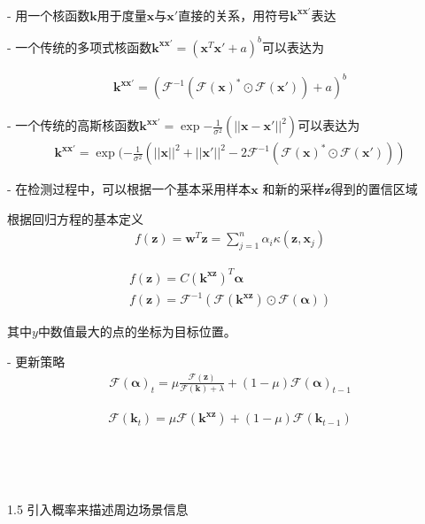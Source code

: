 ​

- 用一个核函数$\mathbf{k}$用于度量$\mathbf{x}$与$\mathbf{x'}$直接的关系，用符号$\mathbf{k}^{\mathbf{x}\mathbf{x'}}$表达

- 一个传统的多项式核函数$\mathbf{k}^{\mathbf{x}\mathbf{x'}}=(\mathbf{x}^T\mathbf{x'}+a)^b$可以表达为

\begin{align}
\mathbf{k}^{\mathbf{x}\mathbf{x'}}=(\mathcal{F}^{-1}(\mathcal{F}(\mathbf{x})^*\odot\mathcal{F}(\mathbf{x'}))+a)^b
\end{align}

- 一个传统的高斯核函数$\mathbf{k}^{\mathbf{x}\mathbf{x'}}=\exp{-\frac{1}{\sigma^2}(||\mathbf{x}-\mathbf{x'}||^2)}$可以表达为
\begin{align}
\mathbf{k}^{\mathbf{x}\mathbf{x'}}=\exp(-\frac{1}{\sigma^2}(||\mathbf{x}||^2+||\mathbf{x'}||^2-2\mathcal{F}^{-1}(\mathcal{F}(\mathbf{x})^*\odot\mathcal{F}(\mathbf{x'})))
\end{align}

- 在检测过程中，可以根据一个基本采用样本$\mathbf{x}$ 和新的采样$\mathbf{z}$得到的置信区域

根据回归方程的基本定义
\begin{align}
f(\mathbf{z})=\mathbf{w}^T\mathbf{z}=\sum_{j=1}^n\alpha_i \kappa(\mathbf{z},\mathbf{x}_j)
\end{align}

\begin{align}
f(\mathbf{z})=C(\mathbf{k}^{\mathbf{x}\mathbf{z}})^T\mathbf{\alpha}\\
f(\mathbf{z})=\mathcal{F}^{-1}(\mathcal{F}(\mathbf{k}^{\mathbf{x}\mathbf{z}})\odot\mathcal{F}(\mathbf{\alpha}))
\end{align}

其中$y$中数值最大的点的坐标为目标位置。

- 更新策略
\begin{align}
\mathcal{F}(\mathbf{\alpha})_t=\mu\frac{\mathcal{F}(\mathbf{z})}{\mathcal{F}(\mathbf{k})+\lambda}+(1-\mu)\mathcal{F}(\mathbf{\alpha})_{t-1}
\end{align}

\begin{align}
\mathcal{F}(\mathbf{k}_t)=\mu\mathcal{F}({\mathbf{k}^{\mathbf{x}\mathbf{z}}})+(1-\mu)\mathcal{F}(\mathbf{k}_{t-1})
\end{align}

​

​

1.5 引入概率来描述周边场景信息

